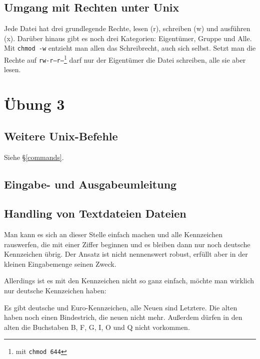\documentclass[12pt]{report}
\begin{document}
\section{Umgang mit Rechten unter Unix}

Jede Datei hat drei grundlegende Rechte, lesen (r), schreiben (w) und ausführen (x). Darüber hinaus gibt es noch drei Kategorien: Eigentümer, Gruppe und Alle. Mit \texttt{chmod -w} entzieht man allen das Schreibrecht, auch sich selbst. Setzt man die Rechte auf \texttt{rw-r--r--}\footnote{mit \texttt{chmod 644}} darf nur der Eigentümer die Datei schreiben, alle sie aber lesen.

\chapter{Übung 3}

\section{Weitere Unix-Befehle}

Siehe §\ref{commands}.

\section{Eingabe- und Ausgabeumleitung}



\section{Handling von Textdateien Dateien}

Man kann es sich an dieser Stelle einfach machen und alle Kennzeichen rauswerfen, die mit einer Ziffer beginnen und es bleiben dann nur noch deutsche Kennzeichen übrig. Der Ansatz ist nicht nennenswert robust, erfüllt aber in der kleinen Eingabemenge seinen Zweck.





Allerdings ist es mit den Kennzeichen nicht so ganz einfach, möchte man wirklich nur deutsche Kennzeichen haben:

Es gibt deutsche und Euro-Kennzeichen, alle Neuen sind Letztere. Die alten haben noch einen Bindestrich, die neuen nicht mehr. Außerdem dürfen in den alten die Buchstaben B, F, G, I, O und Q nicht vorkommen.\cite{wiki-kfz}
\end{document}
